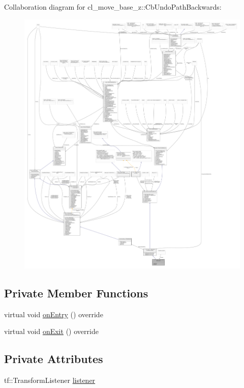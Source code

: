 Collaboration diagram for cl\+\_\+move\+\_\+base\+\_\+z\+:\+:Cb\+Undo\+Path\+Backwards\+:
\nopagebreak
\begin{figure}[H]
\begin{center}
\leavevmode
\includegraphics[width=350pt]{classcl__move__base__z_1_1CbUndoPathBackwards__coll__graph}
\end{center}
\end{figure}
\subsection*{Private Member Functions}
\begin{DoxyCompactItemize}
\item 
virtual void \hyperlink{classcl__move__base__z_1_1CbUndoPathBackwards_a32e680530375b62c7053bf173f6b2b1b}{on\+Entry} () override
\item 
virtual void \hyperlink{classcl__move__base__z_1_1CbUndoPathBackwards_a20cee921ad92db16f8d17c3c3b9c2daf}{on\+Exit} () override
\end{DoxyCompactItemize}
\subsection*{Private Attributes}
\begin{DoxyCompactItemize}
\item 
tf\+::\+Transform\+Listener \hyperlink{classcl__move__base__z_1_1CbUndoPathBackwards_add2b6a0f1c19654a0cf07209fc123a71}{listener}
\end{DoxyCompactItemize}
